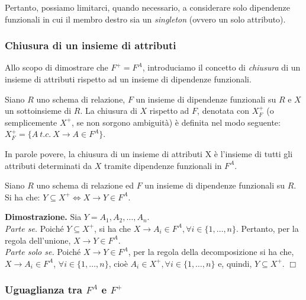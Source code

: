 Pertanto, possiamo limitarci, quando necessario, a considerare solo dipendenze funzionali in cui il
membro destro sia un \emph{singleton} (ovvero un solo attributo).

\subsubsection{Chiusura di un insieme di attributi}

Allo scopo di dimostrare che $F^+ = F^A$, introduciamo il concetto di \emph{chiusura} di un insieme di attributi
rispetto ad un insieme di dipendenze funzionali. 
\begin{defn}
Siano $R$ uno schema di relazione, $F$ un insieme di dipendenze funzionali su $R$ e $X$ un sottoinsieme di $R$.
La chiusura di $X$ rispetto ad $F$, denotata con $X^+_F$ (o semplicemente $X^+$, se non sorgono ambiguità) è 
definita nel modo seguente: $X^+_F = \{A\ t.c.\ X \rightarrow A \in F^A\}$.
\end{defn}
In parole povere, la chiusura di un insieme di attributi X è l'insieme di tutti gli attributi determinati da $X$
tramite dipendenze funzionali in $F^A$.
\label{lemma4_1}
\begin{lem}
Siano $R$ uno schema di relazione ed $F$ un insieme di dipendenze funzionali su $R$. Si ha che:
$Y \subseteq X^+\Leftrightarrow X \rightarrow Y \in F^A$.
\end{lem}

\textbf{Dimostrazione.} Sia $Y = A_1, A_2, \ldots, A_n$.\\
\emph{Parte se.} Poiché $Y \subseteq X^+$, si ha che $X \rightarrow A_i \in F^A, \forall i \in \{1, \ldots, n\}$. 
Pertanto, per la regola dell'unione, $X \rightarrow Y \in F^A$.\\
\emph{Parte solo se.} Poiché $X \rightarrow Y \in F^A$, per la regola della decomposizione si ha che, 
$X \rightarrow A_i \in F^A$, $\forall i \in \{1, \ldots, n\}$, cioè $A_i \in X^+, \forall i \in \{1, \ldots, n\}$ 
e, quindi, $Y \subseteq X^+$. \hfill $\Box$

\subsubsection{Uguaglianza tra $F^A$ e $F^+$}

